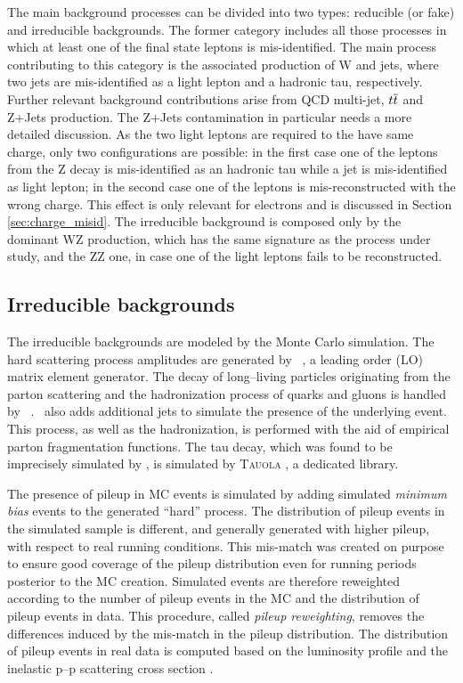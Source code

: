 The main background processes can be divided into two types: reducible (or fake) and irreducible backgrounds. The former category includes all those processes in which at least one of the final state leptons is mis-identified. The main process contributing to this category is the associated production of W and jets, where two jets are mis-identified as a light lepton and a hadronic tau, respectively. Further relevant background contributions arise from QCD multi-jet, $t\overline{t}$ and Z+Jets production. The Z+Jets contamination in particular needs a more detailed discussion. As the two light leptons are required to the have same charge, only two configurations are possible: in the first case one of the leptons from the Z decay is mis-identified as an hadronic tau while a jet is mis-identified as light lepton; in the second case one of the leptons is mis-reconstructed with the wrong charge. This effect is only relevant for electrons and is discussed in Section \ref{sec:charge_misid}. The irreducible background is composed only by the dominant WZ production, which has the same signature as the process under study, and the ZZ one, in case one of the light leptons fails to be reconstructed.

\subsection{Irreducible backgrounds}

The irreducible backgrounds are modeled by the Monte Carlo simulation. The hard scattering process amplitudes are generated by \madgraph\ \cite{MG4}, a leading order (LO) matrix element generator. The decay of long--living particles originating from the parton scattering and the hadronization process of quarks and gluons is handled by \pythia\ \cite{pythia}. \pythia\ also adds additional jets to simulate the presence of the underlying event. This process, as well as the hadronization, is performed with the aid of empirical parton fragmentation functions. The tau decay, which was found to be imprecisely simulated by \pythia, is simulated by \textsc{Tauola} \cite{tauola}, a dedicated library. 

The presence of pileup in MC events is simulated by adding simulated \emph{minimum bias} events to the generated ``hard'' process. The distribution of pileup events in the simulated sample is different, and generally generated with higher pileup, with respect to real running conditions. 
This mis-match was created on purpose to ensure good coverage of the pileup distribution even for running periods posterior to the MC creation.
Simulated events are therefore reweighted according to the number of pileup events in the MC and the distribution of pileup events in data. This procedure, called \emph{pileup reweighting}, removes the differences induced by the mis-match in the pileup distribution. The distribution of pileup events in real data is computed based on the luminosity profile and the inelastic p--p scattering cross section \cite{Antchev:2013paa}.

